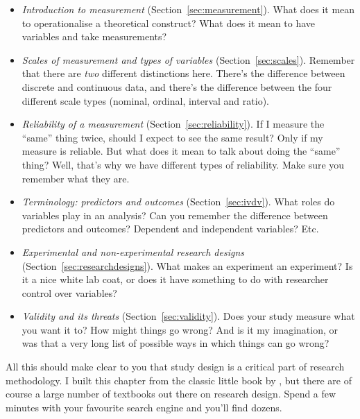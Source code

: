\begin{itemize}
\item {\it Introduction to measurement} (Section~\ref{sec:measurement}). What does it mean to operationalise a theoretical construct? What does it mean to have variables and take measurements?
\item {\it Scales of measurement and types of variables} (Section~\ref{sec:scales}). Remember that there are {\it two} different distinctions here. There's the difference between discrete and continuous data, and there's the difference between the four different scale types (nominal, ordinal, interval and ratio). 
\item {\it Reliability of a measurement} (Section~\ref{sec:reliability}). If I measure the ``same'' thing twice, should I expect to see the same result? Only if my measure is reliable. But what does it mean to talk about doing the ``same'' thing? Well, that's why we have different types of reliability. Make sure you remember what they are.
\item {\it Terminology: predictors and outcomes} (Section~\ref{sec:ivdv}). What roles do variables play in an analysis? Can you remember the difference between predictors and outcomes? Dependent and independent variables? Etc. 
\item {\it Experimental and non-experimental research designs} (Section~\ref{sec:researchdesigns}). What makes an experiment an experiment? Is it a nice white lab coat, or does it have something to do with researcher control over variables?
\item {\it Validity and its threats} (Section~\ref{sec:validity}). Does your study measure what you want it to? How might things go wrong? And is it my imagination, or was that a very long list of possible ways in which things can go wrong? 
\end{itemize}

All this should make clear to you that study design is a critical part of research methodology. I built this chapter from the classic little book by \textcite{Campbell1963}, but there are of course a large number of textbooks out there on research design. Spend a few minutes with your favourite search engine and you'll find dozens. 
